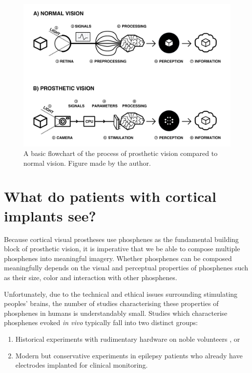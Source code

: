 \documentclass[a4paper,11pt,openany]{book}
\begin{document}
\begin{figure}[htbp]
\centering
\includegraphics[width=.9\linewidth]{./graphics/litreview/flowchart.png}
\caption{\label{fig:org99a3576}
A basic flowchart of the process of prosthetic vision compared to normal vision. Figure made by the author.}
\end{figure}

\chapter{What do patients with cortical implants see?}
\label{sec:org6a0d704}
\label{org04debf3}

Because cortical visual prostheses use phosphenes as the fundamental building block of prosthetic vision, it is imperative that we be able to compose multiple phosphenes into meaningful imagery.
Whether phosphenes can be composed meaningfully depends on the visual and perceptual properties of phosphenes such as their size, color and interaction with other phosphenes.

Unfortunately, due to the technical and ethical issues surrounding stimulating peoples' brains, the number of studies characterising these properties of phosphenes in humans is understandably small.
Studies which characterise phosphenes evoked \emph{in vivo} typically fall into two distinct groups:

\begin{enumerate}
\item Historical experiments with rudimentary hardware on noble volunteers \cite{brindley_sensations_1968,dobelle_artificial_1974,bak_visual_1990}, or
\item Modern but conservative experiments in epilepsy patients who already have electrodes implanted for clinical monitoring. \cite{lee_mapping_2000,winawer_linking_2016,murphey_perceiving_2009,bosking_electrical_2017,collins_preserved_2019}
\end{enumerate}
\end{document}
